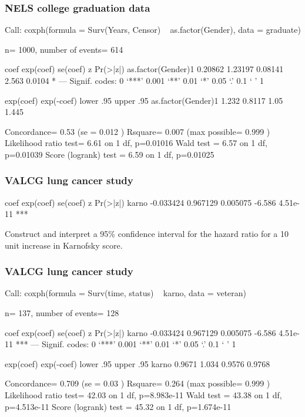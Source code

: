 \begin{frame}[fragile]
\frametitle{NELS college graduation data}
\begin{Rout}{-0.05}
Call:
coxph(formula = Surv(Years, Censor) ~ as.factor(Gender), data = graduate)

  n= 1000, number of events= 614

                      coef exp(coef) se(coef)     z Pr(>|z|)
as.factor(Gender)1 0.20862   1.23197  0.08141 2.563   0.0104 *
---
Signif. codes:  0 ‘***’ 0.001 ‘**’ 0.01 ‘*’ 0.05 ‘.’ 0.1 ‘ ’ 1

                   exp(coef) exp(-coef) lower .95 upper .95
as.factor(Gender)1     1.232     0.8117      1.05     1.445

Concordance= 0.53  (se = 0.012 )
Rsquare= 0.007   (max possible= 0.999 )
Likelihood ratio test= 6.61  on 1 df,   p=0.01016
Wald test            = 6.57  on 1 df,   p=0.01039
Score (logrank) test = 6.59  on 1 df,   p=0.01025
\end{Rout}
\end{frame}

\begin{frame}[fragile]
\frametitle{VALCG lung cancer study}
\begin{Rout}{-0.05}
               coef exp(coef)  se(coef)      z Pr(>|z|)
    karno -0.033424  0.967129  0.005075 -6.586 4.51e-11 ***
\end{Rout}
Construct and interpret a 95\% confidence interval for the hazard ratio for a 10 unit increase in Karnofsky score.
\vskip200pt
\end{frame}

\begin{frame}[fragile]
\frametitle{VALCG lung cancer study}
\begin{Rout}{-0.05}
Call:
coxph(formula = Surv(time, status) ~ karno, data = veteran)

  n= 137, number of events= 128

           coef exp(coef)  se(coef)      z Pr(>|z|)
karno -0.033424  0.967129  0.005075 -6.586 4.51e-11 ***
---
Signif. codes:  0 ‘***’ 0.001 ‘**’ 0.01 ‘*’ 0.05 ‘.’ 0.1 ‘ ’ 1

      exp(coef) exp(-coef) lower .95 upper .95
karno    0.9671      1.034    0.9576    0.9768

Concordance= 0.709  (se = 0.03 )
Rsquare= 0.264   (max possible= 0.999 )
Likelihood ratio test= 42.03  on 1 df,   p=8.983e-11
Wald test            = 43.38  on 1 df,   p=4.513e-11
Score (logrank) test = 45.32  on 1 df,   p=1.674e-11
\end{Rout}
\end{frame}

